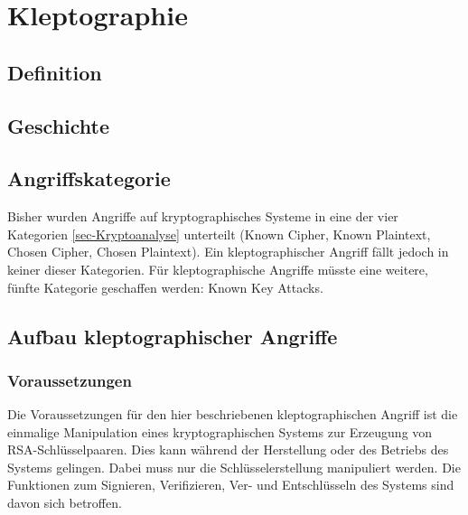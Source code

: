 \chapter{Kleptographie}
    \section{Definition}


    \section{Geschichte}

    \section{Angriffskategorie}
        Bisher wurden Angriffe auf kryptographisches Systeme in eine der vier Kategorien \ref{sec-Kryptoanalyse} unterteilt (Known Cipher, Known Plaintext, Chosen Cipher, Chosen Plaintext). Ein kleptographischer Angriff fällt jedoch in keiner dieser Kategorien. Für kleptographische Angriffe müsste eine weitere, fünfte Kategorie geschaffen werden: Known Key Attacks. 

    \section{Aufbau kleptographischer Angriffe}
    
        \subsection{Voraussetzungen} 
        Die Voraussetzungen für den hier beschriebenen kleptographischen Angriff ist die einmalige Manipulation eines kryptographischen Systems zur Erzeugung von \ac{RSA}-Schlüsselpaaren. Dies kann während der Herstellung oder des Betriebs des Systems gelingen. Dabei muss nur die Schlüsselerstellung manipuliert werden. Die Funktionen zum Signieren, Verifizieren, Ver- und Entschlüsseln des Systems sind davon sich betroffen.


